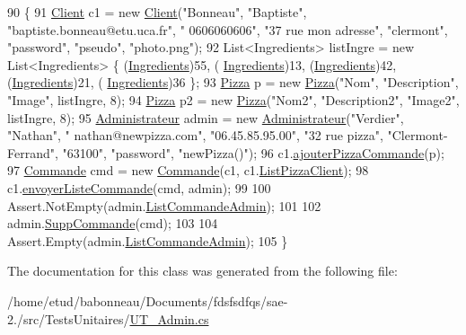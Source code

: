\begin{DoxyCode}
90         \{
91             \hyperlink{classModele_1_1Client}{Client} c1 = \textcolor{keyword}{new} \hyperlink{classModele_1_1Client}{Client}(\textcolor{stringliteral}{"Bonneau"}, \textcolor{stringliteral}{"Baptiste"}, \textcolor{stringliteral}{"baptiste.bonneau@etu.uca.fr"}, \textcolor{stringliteral}{"
      0606060606"}, \textcolor{stringliteral}{"37 rue mon adresse"}, \textcolor{stringliteral}{"clermont"}, \textcolor{stringliteral}{"password"}, \textcolor{stringliteral}{"pseudo"}, \textcolor{stringliteral}{"photo.png"});
92             List<Ingredients> listIngre = \textcolor{keyword}{new} List<Ingredients> \{ (\hyperlink{namespaceModele_a001a8e89e56a724f24a249ba98080d41}{Ingredients})55, (
      \hyperlink{namespaceModele_a001a8e89e56a724f24a249ba98080d41}{Ingredients})13, (\hyperlink{namespaceModele_a001a8e89e56a724f24a249ba98080d41}{Ingredients})42, (\hyperlink{namespaceModele_a001a8e89e56a724f24a249ba98080d41}{Ingredients})21, (
      \hyperlink{namespaceModele_a001a8e89e56a724f24a249ba98080d41}{Ingredients})36 \};
93             \hyperlink{classModele_1_1Pizza}{Pizza} p = \textcolor{keyword}{new} \hyperlink{classModele_1_1Pizza}{Pizza}(\textcolor{stringliteral}{"Nom"}, \textcolor{stringliteral}{"Description"}, \textcolor{stringliteral}{"Image"}, listIngre, 8);
94             \hyperlink{classModele_1_1Pizza}{Pizza} p2 = \textcolor{keyword}{new} \hyperlink{classModele_1_1Pizza}{Pizza}(\textcolor{stringliteral}{"Nom2"}, \textcolor{stringliteral}{"Description2"}, \textcolor{stringliteral}{"Image2"}, listIngre, 8);
95             \hyperlink{classModele_1_1Administrateur}{Administrateur} admin = \textcolor{keyword}{new} \hyperlink{classModele_1_1Administrateur}{Administrateur}(\textcolor{stringliteral}{"Verdier"}, \textcolor{stringliteral}{"Nathan"}, \textcolor{stringliteral}{"
      nathan@newpizza.com"}, \textcolor{stringliteral}{"06.45.85.95.00"}, \textcolor{stringliteral}{"32 rue pizza"}, \textcolor{stringliteral}{"Clermont-Ferrand"}, \textcolor{stringliteral}{"63100"}, \textcolor{stringliteral}{"password"}, \textcolor{stringliteral}{"newPizza()"});
96             c1.\hyperlink{classModele_1_1Client_a328e03bcb8a1b69483ae0fa2ee6e188e}{ajouterPizzaCommande}(p);
97             \hyperlink{classModele_1_1Commande}{Commande} cmd = \textcolor{keyword}{new} \hyperlink{classModele_1_1Commande}{Commande}(c1, c1.\hyperlink{classModele_1_1Client_a14c37e4b9ab856a1e36b7c1610a0536c}{ListPizzaClient});
98             c1.\hyperlink{classModele_1_1Client_a7c4008e301891dd0d1f9e00f44e7adea}{envoyerListeCommande}(cmd, admin);
99 
100             Assert.NotEmpty(admin.\hyperlink{classModele_1_1Administrateur_ad73b7b5b20cd940be7176a42cffda851}{ListCommandeAdmin});
101 
102             admin.\hyperlink{classModele_1_1Administrateur_af58fa8152718abdae5eb6e9b1bb01017}{SuppCommande}(cmd);
103 
104             Assert.Empty(admin.\hyperlink{classModele_1_1Administrateur_ad73b7b5b20cd940be7176a42cffda851}{ListCommandeAdmin});
105         \}
\end{DoxyCode}


The documentation for this class was generated from the following file\+:\begin{DoxyCompactItemize}
\item 
/home/etud/babonneau/\+Documents/fdsfsdfqs/sae-\/2./src/\+Tests\+Unitaires/\hyperlink{UT__Admin_8cs}{U\+T\+\_\+\+Admin.\+cs}\end{DoxyCompactItemize}
